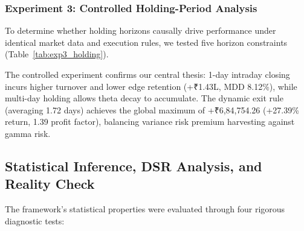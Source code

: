 \documentclass[journal]{IEEEtran}
\begin{document}
\subsubsection{Experiment 3: Controlled Holding-Period Analysis}
To determine whether holding horizons causally drive performance under identical market data and execution rules, we tested five horizon constraints (Table~\ref{tab:exp3_holding}).

\begin{table}[!t]
\renewcommand{\arraystretch}{1.15}
\caption{Experiment 3: Controlled Holding-Period Analysis (375 Sessions)}
\label{tab:exp3_holding}
\centering
{}
\end{table}

The controlled experiment confirms our central thesis: 1-day intraday closing incurs higher turnover and lower edge retention (+₹1.43L, MDD 8.12\%), while multi-day holding allows theta decay to accumulate. The dynamic exit rule (averaging 1.72 days) achieves the global maximum of +₹6,84,754.26 (+27.39\% return, 1.39 profit factor), balancing variance risk premium harvesting against gamma risk.

\subsection{Statistical Inference, DSR Analysis, and Reality Check}

The framework's statistical properties were evaluated through four rigorous diagnostic tests:
\end{document}
